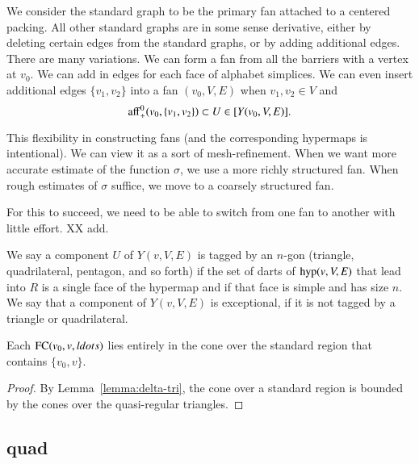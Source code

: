 We consider the standard graph  to be the
primary fan attached to a centered packing.  All other
standard graphs are in some sense derivative, either by deleting
certain edges from the standard graphs, or by adding additional
edges.  There are many variations.  We can form a fan from all
the barriers with a vertex at $v_0$.  We can add in edges for
each face of alphabet simplices.  We can even insert additional
edges $\{v_1,v_2\}$ into a fan $(v_0,V,E)$ when $v_1,v_2\in V$ and
$${\operatorname{aff}}_+^0(v_0,\{v_1,v_2\})\subset U\in [Y(v_0,V,E)].$$

This flexibility in constructing fans (and the corresponding
hypermaps is intentional).  
We can view it as a sort of mesh-refinement.
When we want more accurate estimate of the function $\sigma$, we
use a more richly structured fan.  When rough estimates of $\sigma$
suffice, we move to a coarsely structured fan.

For this to succeed, we need to be able to switch from one fan
to another with little effort.  XX add.




\begin{definition} 
We say a component $U$ of $Y(v,V,E)$ is
tagged by an
$n$-gon (triangle, quadrilateral, pentagon, and so forth) if
the set of darts of ${\operatorname{hyp}}(v,V,E)$ that lead into $R$ is
a single face of the hypermap and if that face is simple and has
size $n$.   We say that
a component of $Y(v,V,E)$ is exceptional, if it is not tagged by a
triangle or quadrilateral.
\end{definition}


\begin{lemma}
Each ${\operatorname{FC}}(v_0,v,ldots)$ lies entirely in the cone over the standard
region that contains $\{v_0,v\}$.
\end{lemma}

\begin{proof}
By Lemma~\ref{lemma:delta-tri},
the cone over a standard region is bounded by the cones  over the
quasi-regular triangles.
\end{proof}

\subsection{quad}
\label{sec:quad-class}

